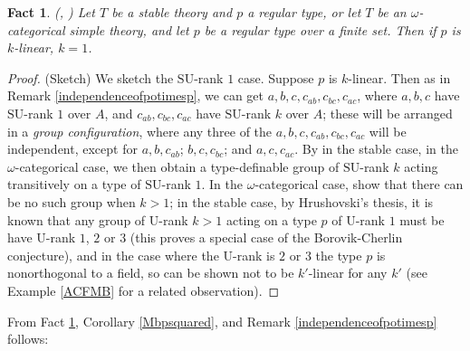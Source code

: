 \documentclass[11pt]{amsart}
\newtheorem{fact}[theorem]{Fact}
\theoremstyle{definition}
\theoremstyle{remark}
\numberwithin{equation}{section}
\begin{document}
\begin{fact} \label{pseudolinearity}(\cite{P96}, \cite{TW03})
    Let $T$ be a stable theory and $p$ a regular type, or let $T$ be an $\omega$-categorical simple theory, and let $p$ be a regular type over a finite set. Then if $p$ is $k$-linear, $k=1$.
\end{fact}
\begin{proof}
    (Sketch) We sketch the $\mathrm{SU}$-rank $1$ case. Suppose $p$ is $k$-linear. Then as in Remark \ref{independenceofpotimesp}, we can get $a, b, c, c_{ab}, c_{bc}, c_{ac}$, where $a, b, c$ have $\mathrm{SU}$-rank $1$ over $A$, and $c_{ab}, c_{bc}, c_{ac}$ have $\mathrm{SU}$-rank $k$ over $A$; these will be arranged in a \textit{group configuration}, where any three of the $a, b, c, c_{ab}, c_{bc}, c_{ac}$ will be independent, except for $a, b, c_{ab}$; $b, c, c_{bc}$; and $a, c, c_{ac}$. By \cite{Hr92} in the stable case, \cite{TW03} in the $\omega$-categorical case, we then obtain a type-definable group of $\mathrm{SU}$-rank $k$ acting transitively on a type of $\mathrm{SU}$-rank $1$. In the $\omega$-categorical case, \cite{TW03} show that there can be no such group when $k > 1$; in the stable case, by Hrushovski's thesis, it is known that any group of $\mathrm{U}$-rank $k > 1$ acting on a type $p$ of $\mathrm{U}$-rank $1$ must be have $\mathrm{U}$-rank $1$, $2$ or $3$ (this proves a special case of the Borovik-Cherlin conjecture), and in the case where the $\mathrm{U}$-rank is $2$ or $3$ the type $p$ is nonorthogonal to a field, so can be shown not to be $k'$-linear for any $k'$ (see Example \ref{ACFMB} for a related observation).
\end{proof}


From Fact \ref{pseudolinearity}, Corollary \ref{Mbpsquared}, and Remark \ref{independenceofpotimesp} follows:
\end{document}
